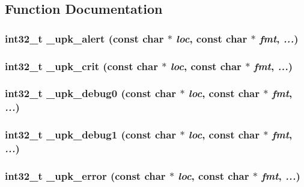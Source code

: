 \subsection{Function Documentation}
\subsubsection{\setlength{\rightskip}{0pt plus 5cm}int32\_\-t \_\-upk\_\-alert (const char $\ast$ {\em loc}, const char $\ast$ {\em fmt},  {\em ...})}\label{group__upk__errors_gea74d3a0830932ca28de5d865f8b418d}


\subsubsection{\setlength{\rightskip}{0pt plus 5cm}int32\_\-t \_\-upk\_\-crit (const char $\ast$ {\em loc}, const char $\ast$ {\em fmt},  {\em ...})}\label{group__upk__errors_g6d3bd493281b0e459e5a0171323f62eb}


\subsubsection{\setlength{\rightskip}{0pt plus 5cm}int32\_\-t \_\-upk\_\-debug0 (const char $\ast$ {\em loc}, const char $\ast$ {\em fmt},  {\em ...})}\label{group__upk__errors_g237d0ac563130db3c1682178ce483214}


\subsubsection{\setlength{\rightskip}{0pt plus 5cm}int32\_\-t \_\-upk\_\-debug1 (const char $\ast$ {\em loc}, const char $\ast$ {\em fmt},  {\em ...})}\label{group__upk__errors_gc13d9fed61710e8ce9dbe2611994f209}


\subsubsection{\setlength{\rightskip}{0pt plus 5cm}int32\_\-t \_\-upk\_\-error (const char $\ast$ {\em loc}, const char $\ast$ {\em fmt},  {\em ...})}\label{group__upk__errors_gf47566875637733fb8629ae958052c7b}


